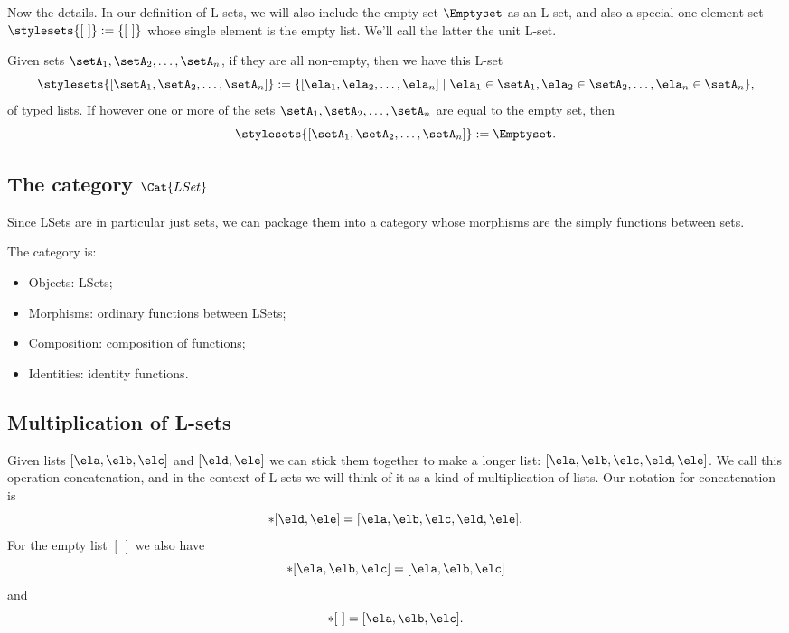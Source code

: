 Now the details. In our definition of L-sets, we will also include the empty set $\Emptyset$ as an L-set, and also a special one-element set $\stylesets{[ \ ]} := \{ [ \ ] \}$ whose single element is the empty list. We'll call the latter the unit L-set. 

Given sets $\setA_1, \setA_2, \dots , \setA_n$, if they are all non-empty, then we have this L-set
\begin{equation}
\stylesets{[\setA_1, \setA_2, \dots, \setA_n]} := \{ [ \ela_1, \ela_2, \dots, \ela_n] \mid \ela_1 \in \setA_1, \ela_2 \in \setA_2, \dots, \ela_n \in \setA_n \},
\end{equation}
of typed lists. 
If however one or more of the sets $\setA_1, \setA_2, \dots , \setA_n$ are equal to the empty set, then \begin{equation}
\stylesets{[\setA_1, \setA_2, \dots, \setA_n]} := \Emptyset. 
\end{equation}


\subsection{The category $\Cat{LSet}$}

Since LSets are in particular just sets, we can package them into a category whose morphisms are the simply functions between sets. 

\begin{ctdefinition}
The category  is: 

\begin{itemize}
\item Objects: LSets;
\item Morphisms: ordinary functions between LSets;
\item Composition: composition of functions;
\item Identities: identity functions. 
\end{itemize}

\end{ctdefinition}

\subsection{Multiplication of L-sets}

Given lists $[\ela, \elb, \elc]$ and $[\eld, \ele]$ we can stick them together to make a longer list: $[\ela, \elb, \elc, \eld, \ele]$. We call this operation concatenation, and in the context of L-sets we will think of it as a kind of multiplication of lists. Our notation for concatenation is
\begin{equation}
[\ela, \elb, \elc] * [\eld, \ele] = [\ela, \elb, \elc, \eld, \ele].
\end{equation}
For the empty list $[ \ ]$ we also have
\begin{equation}
[ \ ] * [\ela, \elb, \elc]  = [\ela, \elb, \elc] 
\end{equation}
and 
\begin{equation}
[\ela, \elb, \elc]  * [ \ ] = [\ela, \elb, \elc]. 
\end{equation}



